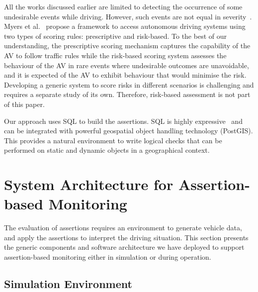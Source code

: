 All the works discussed earlier are limited to detecting the occurrence of some undesirable events while driving. However, such events are not equal in severity~\cite{sinha}. Myers et al.~\cite{myers} propose a framework to access autonomous driving systems using two types of scoring rules: prescriptive and risk-based. To the best of our understanding, the prescriptive scoring mechanism captures the capability of the AV to follow traffic rules while the risk-based scoring system assesses the behaviour of the AV in rare events where undesirable outcomes are unavoidable, and it is expected of the AV to exhibit behaviour that would minimise the risk. Developing a generic system to score risks in different scenarios is challenging and requires a separate study of its own. Therefore, risk-based assessment is not part of this paper.

Our approach uses SQL to build the assertions. SQL is highly expressive~\cite{sqllibkin} and can be integrated with powerful geospatial object handling technology (PostGIS). This provides a natural environment to write logical checks that can be performed on static and dynamic objects in a geographical context. 
%



\section{System Architecture for Assertion-based Monitoring} \label{generic_architecture}

The evaluation of assertions requires an environment to generate vehicle data, and apply the assertions to interpret the driving situation. This section presents the generic components and software architecture we have deployed to support assertion-based monitoring either in simulation or during operation.

\subsection{Simulation Environment} \label{generic_sim_system}

